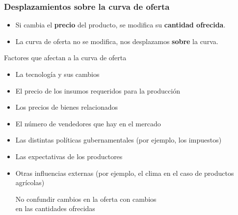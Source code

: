 \documentclass{beamer}
\begin{document}
\begin{frame}
\frametitle{Desplazamientos \textbf{sobre} la curva de oferta}

    \begin{itemize}
        \item Si cambia el \textbf{precio} del producto, se modifica su \textbf{cantidad ofrecida}.
        \item La curva de oferta no se modifica, nos desplazamos \textbf{sobre} la curva.\vspace{1mm}
    \end{itemize}
    \begin{center}
    \end{center}

\end{frame}

\begin{frame}{Factores que afectan a la curva de oferta}
    \begin{itemize}
        \item La tecnología y sus cambios
        \item El precio de los insumos requeridos para la producción
        \item Los precios de bienes relacionados
        \item El número de vendedores que hay en el mercado
        \item Las distintas políticas gubernamentales (por ejemplo, los impuestos)
        \item Las expectativas de los productores
        \item Otras influencias externas (por ejemplo, el clima en el caso de productos agrícolas)  

    \begin{boxB}
    \begin{center}
      No confundir cambios en la oferta con cambios \\ en las cantidades ofrecidas
    \end{center}
    \end{boxB}
    \end{itemize}
\end{frame}
\end{document}
